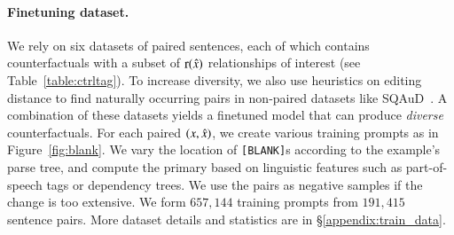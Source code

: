 
\paragraph{Finetuning dataset.}
We rely on six datasets of paired sentences, each of which contains counterfactuals with a subset of $\operatorname*{r}(\hat{x})$ relationships of interest (see Table~\ref{table:ctrltag}). 
To increase diversity, we also use heuristics on editing distance to find naturally occurring pairs in non-paired datasets like SQAuD~\cite{rajpurkar-etal-2016-squad}.
A combination of these datasets yields a finetuned model that can produce \emph{diverse} counterfactuals.
For each paired $(x, \hat{x})$, we create various training prompts as in Figure~\ref{fig:blank}.
We vary the location of \texttt{[BLANK]}s according to the example's parse tree, and compute the primary \tagstrshort based on linguistic features such as part-of-speech tags or dependency trees.
We use the pairs as negative samples if the change is too extensive.
We form $657,144$ training prompts from $191,415$ sentence pairs. 
More dataset details and \tagstrshort statistics are in \S\ref{appendix:train_data}.




